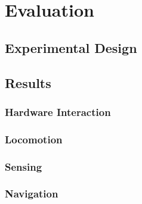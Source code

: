 \chapter{Evaluation}


\section{Experimental Design}

\section{Results}
\subsection{Hardware Interaction}
\subsection{Locomotion}
\subsection{Sensing}
\subsection{Navigation}
